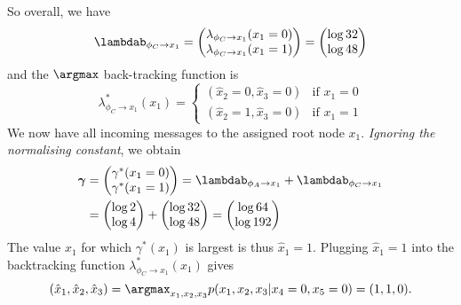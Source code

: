 \begin{exenumerate}
\begin{solution}
        So overall, we have
        \begin{equation}
          \lambdab_{\phi_C \to x_1} = \begin{pmatrix}
            \lambda_{\phi_C \to x_1}(x_1=0)\\
            \lambda_{\phi_C \to x_1}(x_1=1)
          \end{pmatrix}
          = \begin{pmatrix}
            \log 32\\
            \log 48
      \end{pmatrix}
    \end{equation}
    and the $\argmax$ back-tracking function is
    \begin{equation}
      \lambda^*_{\phi_C \to x_1}(x_1) = \begin{cases}
        (\hat{x}_2 = 0, \hat{x}_3 = 0) & \text{if } x_1=0\\
        (\hat{x}_2=1, \hat{x}_3=0) & \text{if } x_1=1
      \end{cases}
    \end{equation}
    We now have all incoming messages to the assigned root node $x_1$. \emph{Ignoring the normalising constant}, we obtain
    \begin{align}
      \boldsymbol{\gamma}&=\begin{pmatrix}
      \gamma^*(x_1=0) \\
      \gamma^*(x_1=1)
      \end{pmatrix}
      =  \lambdab_{\phi_A \to x_1} +  \lambdab_{\phi_C \to x_1}\\
      &=  \begin{pmatrix}
        \log 2\\
        \log 4
      \end{pmatrix} +
      \begin{pmatrix}
        \log 32\\
        \log 48
      \end{pmatrix}
      =
      \begin{pmatrix}
        \log 64\\
        \log 192
      \end{pmatrix}
    \end{align}
    The value $x_1$ for which $\gamma^*(x_1)$ is largest is thus
    $\hat{x}_1 = 1$. Plugging $\hat{x}_1 = 1$ into the backtracking
    function $\lambda^*_{\phi_C \to x_1}(x_1)$ gives 
    \begin{equation}
      (\hat{x}_1, \hat{x}_2, \hat{x}_3) = \argmax_{x_1, x_2, x_3} p(x_1, x_2, x_3 | x_4=0, x_5=0) = (1,1,0).
    \end{equation}
    

\end{solution}
\end{exenumerate}
